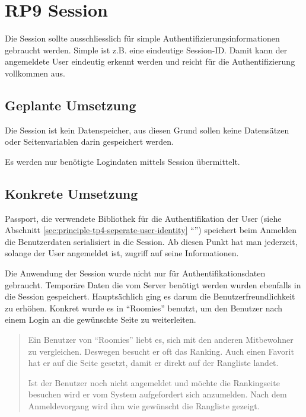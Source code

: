 \section{RP9 Session}
\label{sec:principle-rp9-session}

Die Session sollte ausschliesslich für simple Authentifizierungsinformationen gebraucht werden. Simple ist z.B. eine eindeutige Session-ID. Damit kann der angemeldete User eindeutig erkennt werden und reicht für die Authentifizierung vollkommen aus.

\subsection*{Geplante Umsetzung}
Die Session ist kein Datenspeicher, aus diesen Grund sollen keine Datensätzen oder Seitenvariablen darin gespeichert werden.

Es werden nur benötigte Logindaten mittels Session übermittelt.

\subsection*{Konkrete Umsetzung}
Passport, die verwendete Bibliothek für die Authentifikation der User (siehe Abschnitt \ref{sec:principle-tp4-seperate-user-identity} ``'') speichert beim Anmelden die Benutzerdaten serialisiert in die Session. Ab diesen Punkt hat man jederzeit, solange der User angemeldet ist, zugriff auf seine Informationen.

Die Anwendung der Session wurde nicht nur für Authentifikationsdaten gebraucht. Temporäre Daten die vom Server benötigt werden wurden ebenfalls in die Session gespeichert. Hauptsächlich ging es darum die Benutzerfreundlichkeit zu erhöhen. Konkret wurde es in ``Roomies'' benutzt, um den Benutzer nach einem Login an die gewünschte Seite zu weiterleiten.

\begin{quotation}
Ein Benutzer von ``Roomies'' liebt es, sich mit den anderen Mitbewohner zu vergleichen. Deswegen besucht er oft das Ranking. Auch einen Favorit hat er auf die Seite gesetzt, damit er direkt auf der Rangliste landet.

Ist der Benutzer noch nicht angemeldet und möchte die Rankingseite besuchen wird er vom System aufgefordert sich anzumelden. Nach dem Anmeldevorgang wird ihm wie gewünscht die Rangliste gezeigt.
\end{quotation}

